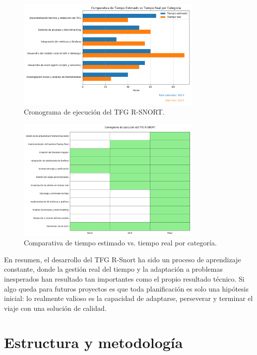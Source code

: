 \documentclass[11pt,a4paper,twoside]{report}
\begin{document}
\begin{figure}[H]
	\centering
	\includegraphics[width=0.8\textwidth]{cronologia/1.png}
	\caption{Cronograma de ejecución del TFG R-SNORT.}
\end{figure}

\begin{figure}[H]
	\centering
	\includegraphics[width=0.8\textwidth]{cronologia/2.png}
	\caption{Comparativa de tiempo estimado vs. tiempo real por categoría.}
\end{figure}

\newpage

En resumen, el desarrollo del TFG R-Snort ha sido un proceso de aprendizaje constante, donde la gestión real del tiempo y la adaptación a problemas inesperados han resultado tan importantes como el propio resultado técnico. Si algo queda para futuros proyectos es que toda planificación es solo una hipótesis inicial: lo realmente valioso es la capacidad de adaptarse, perseverar y terminar el viaje con una solución de calidad.

\section{Estructura y metodología}
\end{document}
